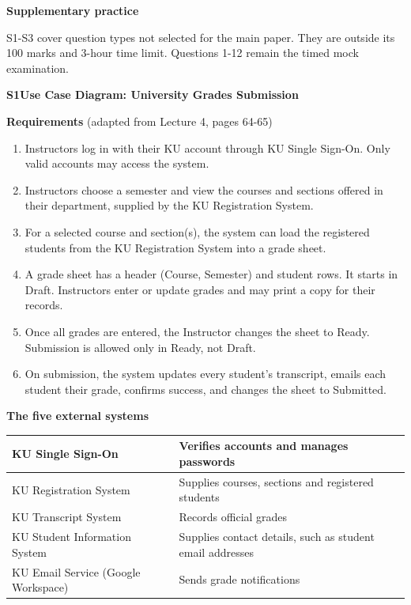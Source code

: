 \newpage
\textbf{\Large Supplementary practice}\par
S1-S3 cover question types not selected for the main paper. They are outside its 100 marks and 3-hour time limit. Questions 1-12 remain the timed mock examination.\par
\medskip
\textbf{S1\quad Use Case Diagram: University Grades Submission}\par
\textbf{Requirements} (adapted from Lecture 4, pages 64-65)\par
\begin{enumerate}[itemsep=3pt]
\item Instructors log in with their KU account through KU Single Sign-On. Only valid accounts may access the system.
\item Instructors choose a semester and view the courses and sections offered in their department, supplied by the KU Registration System.
\item For a selected course and section(s), the system can load the registered students from the KU Registration System into a grade sheet.
\item A grade sheet has a header (Course, Semester) and student rows. It starts in Draft. Instructors enter or update grades and may print a copy for their records.
\item Once all grades are entered, the Instructor changes the sheet to Ready. Submission is allowed only in Ready, not Draft.
\item On submission, the system updates every student's transcript, emails each student their grade, confirms success, and changes the sheet to Submitted.
\end{enumerate}
\textbf{The five external systems}\par
\begin{tabularx}{\linewidth}{|>{\raggedright\arraybackslash}m{5.3cm}|Y|}\hline
KU Single Sign-On & Verifies accounts and manages passwords\\\hline
KU Registration System & Supplies courses, sections and registered students\\\hline
KU Transcript System & Records official grades\\\hline
KU Student Information System & Supplies contact details, such as student email addresses\\\hline
KU Email Service (Google Workspace) & Sends grade notifications\\\hline
\end{tabularx}
